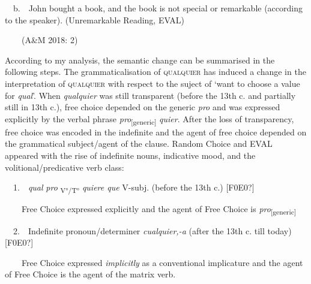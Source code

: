 \begin{styleStandard}
\ \ b.\ \ John bought a book, and the book is not special or remarkable (according to the speaker). (Unremarkable Reading, EVAL)
\end{styleStandard}

\begin{styleStandard}
\ \ \ \ (A\&M 2018: 2)
\end{styleStandard}

\begin{styleStandard}
According to my analysis, the semantic change can be summarised in the following steps. The grammaticalisation of \textsc{qualquier} has induced a change in the interpretation of \textsc{qualquier} with respect to the suject of ‘want to choose a value for \textit{qual}’. When \textit{qualquier} was still transparent (before the 13th c. and partially still in 13th c.), free choice depended on the generic \textit{pro} and was expressed explicitly by the verbal phrase \textit{pro}\textsubscript{[generic] }\textit{quier}. After the loss of transparency, free choice was encoded in the indefinite and the agent of free choice depended on the grammatical subject/agent of the clause. Random Choice and EVAL appeared with the rise of indefinite nouns, indicative mood, and the volitional/predicative verb class:
\end{styleStandard}

\begin{styleStandard}
\ \ 1.\ \ \textit{qual} \textit{pro} \textsubscript{V°/T°} \textit{quiere que} V-subj. (before the 13th c.) [F0E0?]
\end{styleStandard}

\begin{styleStandard}
\ \ \ \ Free Choice expressed explicitly and the agent of Free Choice is \textit{pro}\textsubscript{[generic]}
\end{styleStandard}

\begin{styleListParagraph}
\textmd{\ \ }2.\textmd{\ \ Indefinite pronoun/determiner }\textmd{\textit{cualquier,-a}}\textmd{ (after the 13th c. till today) [F0E0?]}
\end{styleListParagraph}

\begin{styleListParagraph}
\textmd{\ \ \ \ Free Choice expressed }\textmd{\textit{implicitly}}\textmd{ as a conventional implicature and the agent of Free Choice is the agent of the matrix verb.}
\end{styleListParagraph}

